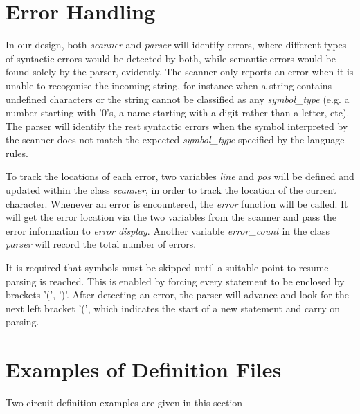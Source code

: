 \documentclass[12pt]{article}
\def\n{\noindent}
\begin{document}
\section{Error Handling}
\n In our design, both \textit{scanner} and \textit{parser} will identify errors, where different types of syntactic errors would be detected by both, while semantic errors would be found solely by the parser, evidently. The scanner only reports an error when it is unable to recogonise the incoming string, for instance when a string contains undefined characters or the string cannot be classified as any \emph{symbol\_type} (e.g. a number starting with '0's, a name starting with a digit rather than a letter, etc). The parser will identify the rest syntactic errors when the symbol interpreted by the scanner does not match the expected \emph{symbol\_type} specified by the language rules.


\vspace{0.3cm}

\n To track the locations of each error, two variables \textit{line} and \textit{pos} will be defined and updated within the class \textit{scanner}, in order to track the location of the current character. Whenever an error is encountered, the \textit{error} function will be called. It will get the error location via the two variables from the scanner and pass the error information to \textit{error display}. Another variable \emph{error\_count} in the class \textit{parser} will record the total number of errors.


\vspace{0.3cm}

\n It is required that symbols must be skipped until a suitable point to resume
parsing is reached. This is enabled by forcing every statement to be enclosed by
brackets '(', ')'. After detecting an error, the parser will advance and look
for the next left bracket '(', which indicates the start of a new statement and
carry on parsing.

\section{Examples of Definition Files}
\n Two circuit definition examples are given in this section\par
\end{document}
